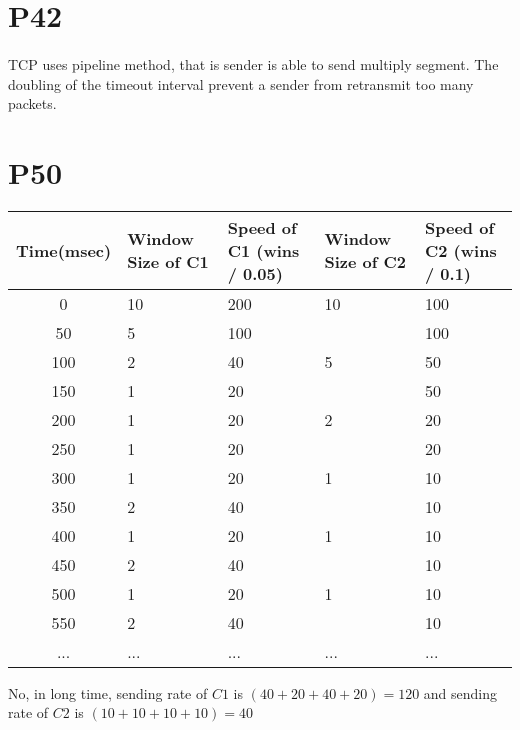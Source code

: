 \documentclass[a4paper, 11pt]{article}
\begin{document}
\section*{P42}
\paragraph{}
TCP uses pipeline method, that is sender is able to send multiply segment. The doubling of the timeout interval prevent a sender from retransmit too many packets.
\section*{P50}
\begin{table*}[!htp]
		\centering
		\begin{tabular}{|c|p{3cm}<{\centering}|p{3cm}<{\centering}|p{3cm}<{\centering}|p{3cm}<{\centering}|}
		\hline
		Time(msec) & Window Size of C1  & Speed of C1 (wins / 0.05) & Window Size of C2 & Speed of C2 (wins / 0.1)\\
		\hline
		0 & 10 & 200 & 10 & 100 \\
		\hline
		50 & 5 & 100 & & 100 \\
		\hline
		100 & 2 & 40 & 5 & 50 \\
		\hline
		150 & 1 & 20 & & 50 \\
		\hline
		200 & 1 & 20 & 2 & 20 \\
		\hline
		250 & 1 & 20 & &20 \\
		\hline
		300 & 1 & 20 & 1 & 10 \\
		\hline
		350 & 2 & 40 & & 10 \\
		\hline
		400 & 1 & 20 & 1 & 10 \\
		\hline
		450 & 2 & 40 & & 10 \\
		\hline
		500 & 1 & 20 & 1 & 10 \\
		\hline
		550 & 2 & 40 & & 10 \\
		\hline
		... & ... & ... & ... & ... \\
		\hline
		\end{tabular}
	\end{table*}
	No, in long time, sending rate of $C1$ is $(40 + 20 + 40 + 20) = 120$ and sending rate of $C2$ is $(10 + 10 + 10 + 10) = 40$
\end{document}
